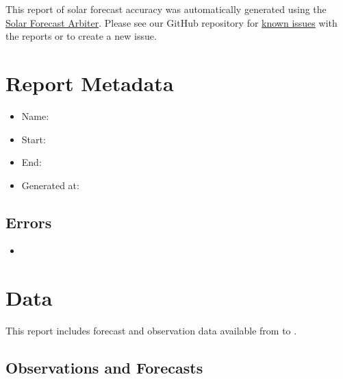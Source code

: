 \documentclass[12pt,letterpaper]{article}
\begin{document}
\title{}
\date{}
\maketitle
This report of solar forecast accuracy was automatically generated using the
\href{https://solarforecastarbiter.org}{Solar Forecast Arbiter}. Please see
our GitHub repository for
\href{https://github.com/solararbiter/solarforecastarbiter-core/issues?q=is%3Aissue+is%3Aopen+label%3Areports}{known issues}
with the reports or to create a new issue.

\tableofcontents
\cleardoublepage
\listoffigures
\cleardoublepage
\listoftables
\cleardoublepage

\section{Report Metadata}

\begin{itemize}
  \item Name: 
  \item Start: 
  \item End: 
  \item Generated at: 
\end{itemize}

\subsection{Errors}

\begin{itemize}
  \item {}
\end{itemize}

\section{Data}

This report includes forecast and observation data available from
 to .

\subsection{Observations and Forecasts}
\end{document}
